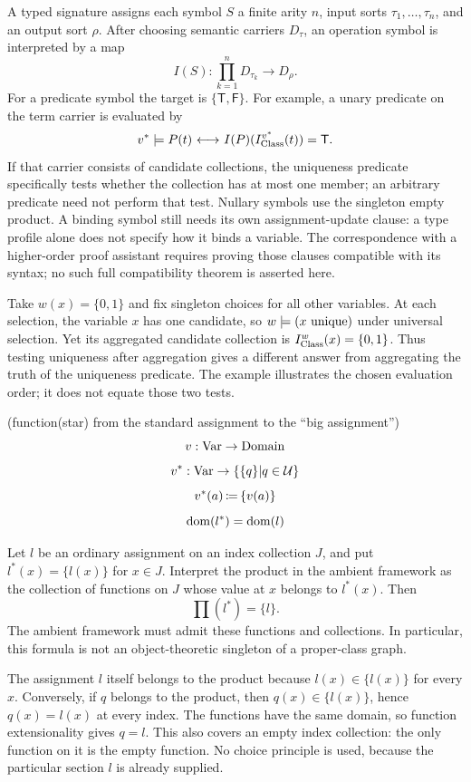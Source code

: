 A typed signature assigns each symbol $S$ a finite arity $n$, input
sorts $\tau_1,\ldots,\tau_n$, and an output sort $\rho$. After choosing
semantic carriers $D_\tau$, an operation symbol is interpreted by a map
\[
I(S):\prod_{k=1}^nD_{\tau_k}\longrightarrow D_\rho.
\]
For a predicate symbol the target is $\{\mathsf T,\mathsf F\}$.
For example, a unary predicate on the term carrier is evaluated by
\[
v^*\models P(t){\ \longleftrightarrow\ }
I(P)(I^{v^*}_{{\text{Class}}}(t))=\mathsf T.
\]
If that carrier consists of candidate collections, the uniqueness
predicate specifically tests whether the collection has at most one
member; an arbitrary predicate need not perform that test. Nullary
symbols use the singleton empty product. A binding symbol still needs
its own assignment-update clause: a type profile alone does not specify
how it binds a variable. The correspondence with a higher-order proof
assistant requires proving those clauses compatible with its syntax;
no such full compatibility theorem is asserted here.

\begin{example*}
Take $w(x)=\{0,1\}$ and fix singleton choices for all other variables.
At each selection, the variable $x$ has one candidate, so
$w\models(x\mathrm{\ unique})$ under universal selection. Yet its aggregated
candidate collection is $I^w_{\text{Class}}(x)=\{0,1\}$. Thus testing uniqueness
after aggregation gives a different answer from aggregating the truth of
the uniqueness predicate. The example illustrates the chosen evaluation
order; it does not equate those two tests.
\end{example*}

\begin{definition}(function(star) from the standard assignment to the ``big assignment'')
\[
v:\mathrm{Var}\to\mathrm{Domain}
\]
\[
v^*:\mathrm{Var}\to\{\{q\}|q\in\mathcal{U}\}
\]
\[
v^*(a)\,{\coloneqq}\, \{v(a)\}
\]
\[
\mathrm{dom}(l^*)=\mathrm{dom}(l)
\]
\end{definition}

\begin{theorem}
Let $l$ be an ordinary assignment on an index collection $J$, and put
$l^*(x)=\{l(x)\}$ for $x\in J$. Interpret the product in the ambient
framework as the collection of functions on $J$ whose value at $x$
belongs to $l^*(x)$. Then
\[
\prod(l^*)=\{l\}.
\]
The ambient framework must admit these functions and collections. In
particular, this formula is not an object-theoretic singleton of a
proper-class graph.
\end{theorem}
\Proof
The assignment $l$ itself belongs to the product because
$l(x)\in\{l(x)\}$ for every $x$. Conversely, if $q$ belongs to the
product, then $q(x)\in\{l(x)\}$, hence $q(x)=l(x)$ at every index.
The functions have the same domain, so function extensionality gives
$q=l$. This also covers an empty index collection: the only function
on it is the empty function. No choice principle is used, because the
particular section $l$ is already supplied.
\Done

